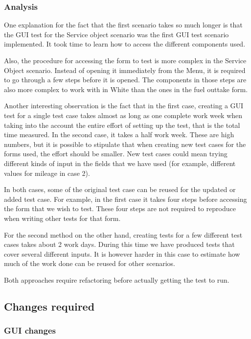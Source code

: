 \documentclass{article}
\begin{document}
			\subsubsection{Analysis}

			One explanation for the fact that the first scenario takes so much longer is that the GUI test for the Service object scenario was the first GUI test scenario implemented. It took time to learn how to access the different components used. 

			Also, the procedure for accessing the form to test is more complex in the Service Object scenario. Instead of opening it immediately from the Menu, it is required to go through a few steps before it is opened. The components in those steps are also more complex to work with in White than the ones in the fuel outtake form.
			
			Another interesting observation is the fact that in the first case, creating a GUI test for a single test case takes almost as long as one complete work week when taking into the account the entire effort of setting up the test, that is the total time measured. In the second case, it takes a half work week. These are high numbers, but it is possible to stipulate that when creating new test cases for the forms used, the effort should be smaller. New test cases could mean trying
			different kinds of input in the fields that we have used (for example, different values for mileage in case 2). 

			In both cases, some of the original test case can be reused for the updated or added test case. For example, in the first case it takes four steps before accessing the form that we wish to test. These four steps are not required to reproduce when writing other tests for that form.
			
			For the second method on the other hand, creating tests for a few different test cases takes about 2 work days. During this time we have produced tests that cover several different inputs. It is however harder in this case to estimate how much of the work done can be reused for other scenarios.


			Both approaches require refactoring before actually getting the test to run.
		\subsection{Changes required}

			\subsubsection{GUI changes}
\end{document}
